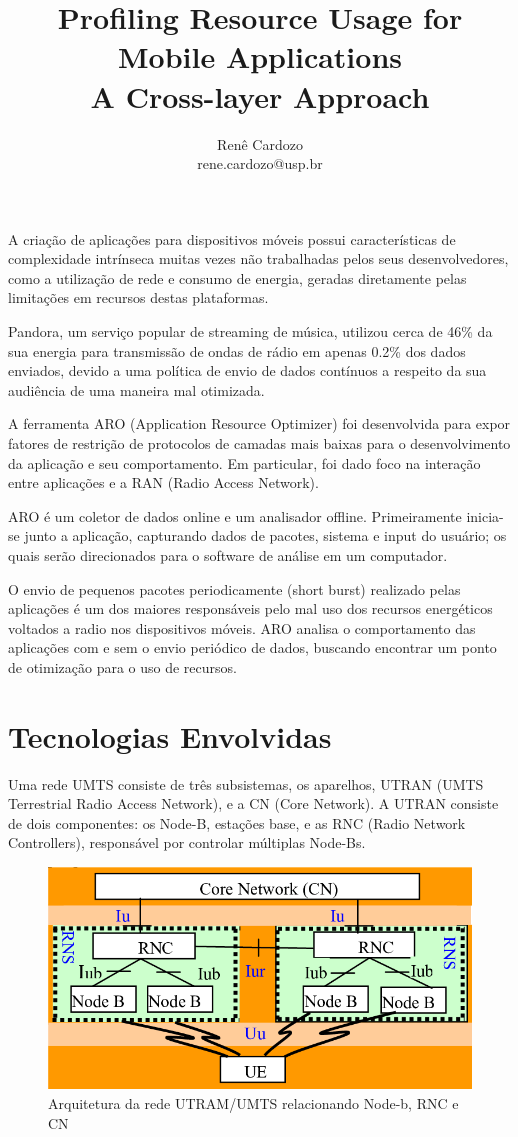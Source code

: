 \documentclass{article}
\author{Renê Cardozo \\ 
        rene.cardozo@usp.br}
\date{}
\title{Profiling Resource Usage for Mobile Applications \\
        A Cross-layer Approach}
\begin{document}
\maketitle

A criação de aplicações para dispositivos móveis possui características de complexidade intrínseca muitas vezes não
trabalhadas pelos seus desenvolvedores, como a utilização de rede e consumo de energia, geradas diretamente pelas
limitações em recursos destas plataformas.

Pandora, um serviço popular de streaming de música, utilizou cerca de 46\% da sua energia para transmissão de ondas de
rádio em apenas 0.2\% dos dados enviados, devido a uma política de envio de dados contínuos a respeito da sua audiência
de uma maneira mal otimizada.

A ferramenta ARO (Application Resource Optimizer) foi desenvolvida para expor fatores de restrição de protocolos de
camadas mais baixas para o desenvolvimento da aplicação e seu comportamento. Em particular, foi dado foco na interação
entre aplicações e a RAN (Radio Access Network).

ARO é um coletor de dados online e um analisador offline. Primeiramente inicia-se junto a aplicação, capturando dados de
pacotes, sistema e input do usuário; os quais serão direcionados para o software de análise em um computador.

O envio de pequenos pacotes periodicamente (short burst) realizado pelas aplicações é um dos maiores responsáveis pelo
mal uso dos recursos energéticos voltados a radio nos dispositivos móveis. ARO analisa o comportamento das aplicações
com e sem o envio periódico de dados, buscando encontrar um ponto de otimização para o uso de recursos.

\section{Tecnologias Envolvidas}
Uma rede UMTS consiste de três subsistemas, os aparelhos, UTRAN (UMTS Terrestrial Radio Access Network), e a CN (Core
Network). A UTRAN consiste de dois componentes: os Node-B, estações base, e as RNC (Radio Network Controllers),
responsável por controlar múltiplas Node-Bs.

\begin{figure}[!h]
\includegraphics[width=\textwidth]{UTRAN-architecture}
\caption{Arquitetura da rede UTRAM/UMTS relacionando Node-b, RNC e CN}
\centering
\end{figure}
\end{document}
